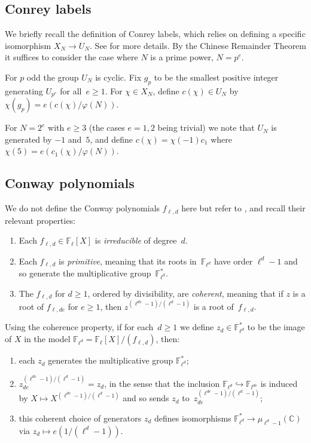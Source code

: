 \documentclass[a4paper, 10pt]{amsart}
\def\C{{\mathbb C}}
\def\F{{\mathbb F}}
\def\Fl{{\mathbb F}_{\ell}}
\def\Fld{{\mathbb F}_{\ell^d}}
\begin{document}
\subsection{Conrey labels}
We briefly recall the definition of Conrey labels, which relies on
defining a specific isomorphism $X_N\to U_N$.  See
\cite{ConreyLabels} for more details. By the Chinese Remainder Theorem
it suffices to consider the case where $N$ is a prime power, $N=p^e$.


For $p$ odd the group $ U_N$ is cyclic.  Fix $g_p$ to be the smallest
positive integer generating $U_{p^e}$ for all~$e\ge1$.  For
$\chi\in X_N$, define $c(\chi)\in U_N$ by $\chi(g_p) =
e(c(\chi)/\varphi(N))$.

For $N=2^e$ with $e\ge3$ (the cases $e=1,2$ being trivial) we note
that $ U_N$ is generated by $-1$ and~$5$, and define
$c(\chi)=\chi(-1)c_1$ where $\chi(5) = e(c_1(\chi)/\varphi(N))$.

\subsection{Conway polynomials}
We do not define the Conway polynomials $f_{\ell,d}$ here but refer to
\cite{ConwayPol}, and recall their relevant properties:
\begin{enumerate}
\item Each $f_{\ell,d}\in\Fl[X]$ is \emph{irreducible} of degree~$d$.
\item Each $f_{\ell,d}$ is \emph{primitive}, meaning that its roots
  in~$\Fld$ have order $\ell^d-1$ and so generate the multiplicative
  group~$\Fld^*$.
\item The $f_{\ell,d}$ for $d\ge1$, ordered by divisibility, are
  \emph{coherent}, meaning that if $z$ is a root of $f_{\ell,de}$ for
  $e\ge1$, then $z^{(\ell^{de}-1)/(\ell^d-1)}$ is a root
  of~$f_{\ell,d}$.
\end{enumerate}
Using the coherence property, if for each~$d\ge1$ we define
$z_d\in\Fld^*$ to be the image of $X$ in the model $\Fld =
\Fl[X]/(f_{\ell,d})$, then:
\begin{enumerate}
\item each $z_d$ generates the multiplicative group $\Fld^*$;
\item $z_{de}^{(\ell^{de}-1)/(\ell^d-1)}=z_d$, in the sense that the
  inclusion $\Fld\hookrightarrow\F_{l^{de}}$ is induced by $X\mapsto
  X^{(\ell^{de}-1)/(\ell^d-1)}$ and so sends $z_d$
  to~$z_{de}^{(\ell^{de}-1)/(\ell^d-1)}$;
\item this coherent choice of generators $z_d$ defines isomorphisms
  $\Fld^*\to\mu_{\ell^d-1}(\C)$ via $z_d\mapsto e(1/(\ell^d-1))$.
\end{enumerate}
\end{document}
